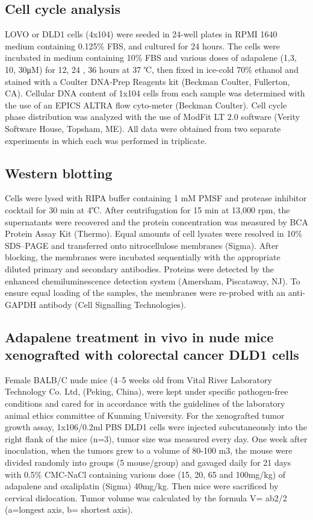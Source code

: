 \subsection{Cell cycle analysis}

LOVO or DLD1 cells (4x104) were seeded in 24-well plates in RPMI 1640 medium containing 0.125\% FBS, and cultured for 24 hours. The cells were incubated in medium containing 10\% FBS and various doses of adapalene (1,3, 10, 30μM) for 12, 24 , 36 hours at 37 ℃, then fixed in ice-cold 70\% ethanol and stained with a Coulter DNA-Prep Reagents kit (Beckman Coulter, Fullerton, CA). Cellular DNA content of 1x104 cells from each sample was determined with the use of an EPICS ALTRA flow cyto-meter (Beckman Coulter). Cell cycle phase distribution was analyzed with the use of ModFit LT 2.0 software (Verity Software House, Topsham, ME). All data were obtained from two separate experiments in which each was performed in triplicate.

\subsection{Western blotting}

Cells were lysed with RIPA buffer containing 1 mM PMSF and protease inhibitor cocktail for 30 min at 4℃. After centrifugation for 15 min at 13,000 rpm, the supernatants were recovered and the protein concentration was measured by BCA Protein Assay Kit (Thermo). Equal amounts of cell lysates were resolved in 10\% SDS–PAGE and transferred onto nitrocellulose membranes (Sigma). After blocking, the membranes were incubated sequentially with the appropriate diluted primary and secondary antibodies. Proteins were detected by the enhanced chemiluminescence detection system (Amersham, Piscataway, NJ). To ensure equal loading of the samples, the membranes were re-probed with an anti-GAPDH antibody (Cell Signalling Technologies).

\subsection{Adapalene treatment in vivo in nude mice xenografted with colorectal cancer DLD1 cells}

Female BALB/C nude mice (4–5 weeks old from Vital River Laboratory Technology Co. Ltd, (Peking, China), were kept under specific pathogen-free conditions and cared for in accordance with the guidelines of the laboratory animal ethics committee of Kunming University. For the xenografted tumor growth assay, 1x106/0.2ml PBS DLD1 cells were injected subcutaneously into the right flank of the mice (n=3), tumor size was measured every day. One week after inoculation, when the tumors grew to a volume of 80-100 m3, the mouse were divided randomly into groups (5 mouse/group) and gavaged daily for 21 days with 0.5\% CMC-NaCl containing various dose (15, 20, 65 and 100mg/kg) of adapalene and oxaliplatin (Sigma) 40mg/kg. Then mice were sacrificed by cervical dislocation. Tumor volume was calculated by the formula V= ab2/2 (a=longest axis, b= shortest axis).

